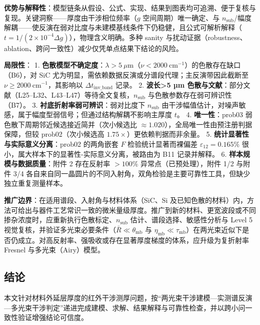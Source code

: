 \textbf{优势与解释性}：模型链条从假设、公式、实现、结果到图表均可追溯、便于复核与复现。关键洞察------厚度由干涉相位频率（\(g\)
空间周期）唯一确定、与
\(n_{\mathrm{sub}}\)/幅度解耦------使反演在弱对比度与未建模基线条件下仍稳健，且公式可解析解释（\(t=1/(2\times10^{-4}\Delta g)\)），物理含义明确。多种
sanity
与扰动证据（robustness、ablation、跨问一致性）减少仅凭单点结果下结论的风险。

\textbf{局限性}： 1.
\textbf{色散模型不确定度}：\(\lambda>5\ \mu\mathrm{m}\)（\(\nu<2000\ \mathrm{cm}^{-1}\)）的色散存在缺口（B6），对
SiC 尤为明显，需依赖数据反演或分谱段代理；主反演带因此截断至
\(\nu\ge2000\ \mathrm{cm}^{-1}\)，其影响以
\(\Delta t_{\mathrm{inv\_band}}\) 记录。 2. \textbf{波长\textgreater5 µm
色散与文献}：部分文献（L25--L32、L43--L47）等待全文复核，\(n_{\mathrm{sub}}\)
与色散参数存在弱可辨识性（B7）。 3.
\textbf{衬底折射率弱可辨识}：弱对比度下 \(n_{\mathrm{sub}}\)
由干涉幅值估计，对噪声敏感，属于幅度型弱信号；但通过结构解耦不影响主厚度
\(t\)。 4. \textbf{唯一性}：prob03
弱色散下周期邻近候选接近简并（次小候选比
\(\approx1.020\)），全局唯一性由预注册判据保障，但较 prob02（次小候选高
\(1.75\times\)）更依赖判据而非余量。 5.
\textbf{统计显著性与实际意义分离}：prob02 的两角嵌套 \(F\)
检验统计显著而裸偏差 \(\varepsilon_{12}=0.165\%\)
很小，属大样本下的显著性-实际意义分离，被路由为 B11 记录并解释。 6.
\textbf{样本规模与数据质量}：附件 2 存在反射率 \(>100\%\)
异常点（已预处理），附件 1/2 与附件 3/4
各自来自同一晶圆片的不同入射角，双角检验是主要可靠性工具，但缺少独立重复测量样本。

\textbf{推广边界}：在适用谱段、入射角与材料体系（SiC、Si
及已知色散的材料）内，方法可给出与器件工艺常识一致的微米量级厚度。推广到新的材料、更宽波段或不同掺杂浓度时，应重新执行色散标定、\(n_{\mathrm{sub}}\)
估计、谱段选择、敏感性分析与 Level 5
视觉复核，并验证多光束必要条件（\(\bar R\ll\theta_{\mathrm{mb}}\) 与
\(\eta_{\mathrm{mb}}\ll\tau_{\mathrm{mb}}\)）在两光束近似下是否仍成立。对高反射率、强吸收或存在显著厚度梯度的体系，应升级为复折射率
Fresnel 与多光束（Airy）模型。

\subsection{结论}\label{ux7ed3ux8bba}

本文针对材料外延层厚度的红外干涉测厚问题，按``两光束干涉建模---实测谱反演---多光束干涉判定''递进完成建模、求解、结果解释与可靠性检查，并以跨小问一致性验证增强结论可信度。

